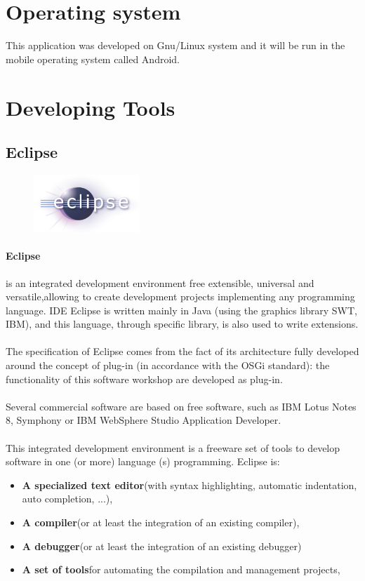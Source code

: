 \section{Operating system}
This application was developed on Gnu/Linux system and it will be run in the mobile operating system called Android.


\section{Developing Tools}
\subsection{Eclipse}
\begin{figure}
\includegraphics[width=4cm]{./images/implementation/Eclipselogo}
\end{figure}
\paragraph{Eclipse}is an integrated development environment free extensible, universal and versatile,allowing to create development projects implementing any programming language.
IDE Eclipse is written mainly in Java (using the graphics library SWT, IBM), and this language, through specific library, is also used to write extensions.
\paragraph{}The specification of Eclipse comes from the fact of its architecture fully developed around the concept of plug-in (in accordance with the OSGi standard):
the functionality of this software workshop are developed as plug-in.
\paragraph{}Several commercial software are based on free software, such as IBM Lotus Notes 8, Symphony or IBM WebSphere Studio Application Developer.
\paragraph{}This integrated development environment is a freeware set of tools to develop software in one (or more) language (s) programming. Eclipse is:
\begin{itemize}
 \item \textbf{A specialized text editor}(with syntax highlighting, automatic indentation, auto completion, ...),
 \item \textbf{A compiler}(or at least the integration of an existing compiler),
 \item \textbf{A debugger}(or at least the integration of an existing debugger)
 \item \textbf{A set of tools}for automating the compilation and management projects,
\end{itemize}
